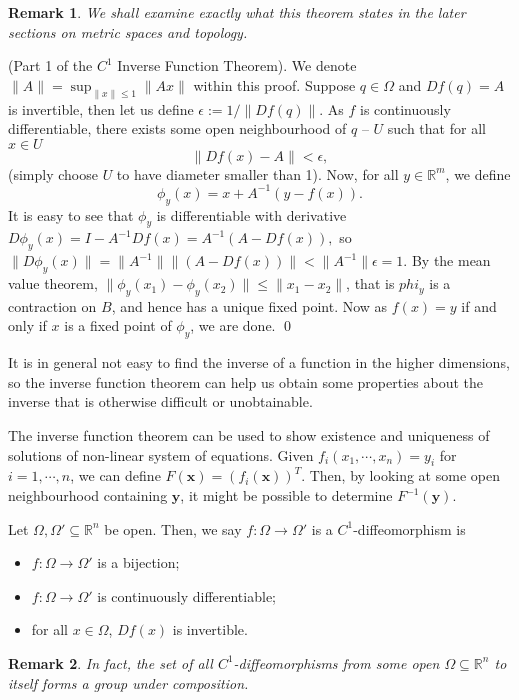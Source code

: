 \documentclass[
]{article}
\newtheorem*{remark}{Remark}
\theoremstyle{definition}
\begin{document}
\begin{remark}
  We shall examine exactly what this theorem states in the later sections on 
  metric spaces and topology.
\end{remark}

\proof (Part 1 of the \(C^1\) Inverse Function Theorem). We denote
\(\|A\| = \sup_{\|x\| \le 1} \|Ax\|\) within this proof. Suppose
\(q \in \Omega\) and \(Df(q) = A\) is invertible, then let us define
\(\epsilon := 1 / \|Df(q)\|\). As \(f\) is continuously differentiable,
there exists some open neighbourhood of \(q\) -- \(U\) such that for all
\(x \in U\) \[\|Df(x) - A\| < \epsilon,\] (simply choose \(U\) to have
diameter smaller than 1). Now, for all \(y \in \mathbb{R}^m\), we define
\[\phi_y(x) = x + A^{-1}(y - f(x)).\] It is easy to see that \(\phi_y\)
is differentiable with derivative
\(D\phi_y(x) = I - A^{-1}Df(x) = A^{-1}(A - Df(x)),\) so
\(\|D\phi_y(x)\| = \|A^{-1}\| \|(A - Df(x))\| < \|A^{-1}\|\epsilon = 1\).
By the mean value theorem,
\(\| \phi_y(x_1) - \phi_y(x_2) \| \le \| x_1 - x_2 \|\), that is
\(phi_y\) is a contraction on \(B\), and hence has a unique fixed point.
Now as \(f(x) = y\) if and only if \(x\) is a fixed point of \(\phi_y\),
we are done. \qed

It is in general not easy to find the inverse of a function in the
higher dimensions, so the inverse function theorem can help us obtain
some properties about the inverse that is otherwise difficult or
unobtainable.

The inverse function theorem can be used to show existence and
uniqueness of solutions of non-linear system of equations. Given
\(f_i(x_1, \cdots, x_n) = y_i\) for \(i = 1,\cdots , n\), we can define
\(F(\mathbf{x}) = (f_i(\mathbf{x}))^T\). Then, by looking at some open
neighbourhood containing \(\mathbf{y}\), it might be possible to
determine \(F^{-1}(\mathbf{y})\).

Let \(\Omega, \Omega' \subseteq \mathbb{R}^n\) be open. Then, we say
\(f : \Omega \to \Omega'\) is a \(C^1\)-diffeomorphism is

\begin{itemize}
  \item \(f : \Omega \to \Omega'\) is a bijection;
  \item \(f : \Omega \to \Omega'\) is continuously differentiable;
  \item for all \(x \in \Omega\), \(Df(x)\) is invertible.
\end{itemize}

\begin{remark}
  In fact, the set of all \(C^1\)-diffeomorphisms from some open 
  \(\Omega \subseteq \mathbb{R}^n\) to itself forms a group under composition.
\end{remark}
\end{document}

